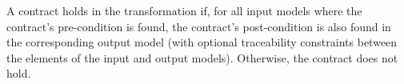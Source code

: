 A contract holds in the transformation if, for all input models where the contract's pre-condition is found, the contract's post-condition is also found in the corresponding output model (with optional traceability constraints between the elements of the input and output models). Otherwise, the contract does not hold.


